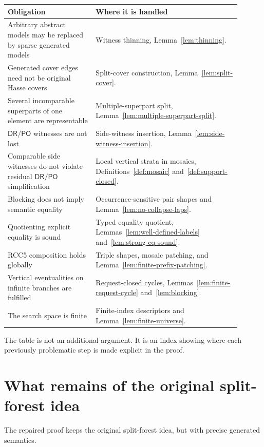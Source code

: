 \documentclass[11pt]{article}
\newcommand{\DR}{\mathsf{DR}}
\newcommand{\PO}{\mathsf{PO}}
\begin{document}
\begin{center}
\begin{tabular}{p{0.34\linewidth}p{0.56\linewidth}}
\toprule
Obligation & Where it is handled \\
\midrule
Arbitrary abstract models may be replaced by sparse generated models & Witness thinning, Lemma~\ref{lem:thinning}. \\
Generated cover edges need not be original Hasse covers & Split-cover construction, Lemma~\ref{lem:split-cover}. \\
Several incomparable superparts of one element are representable & Multiple-superpart split, Lemma~\ref{lem:multiple-superpart-split}. \\
$\DR/\PO$ witnesses are not lost & Side-witness insertion, Lemma~\ref{lem:side-witness-insertion}. \\
Comparable side witnesses do not violate residual $\DR/\PO$ simplification & Local vertical strata in mosaics, Definitions~\ref{def:mosaic} and~\ref{def:support-closed}. \\
Blocking does not imply semantic equality & Occurrence-sensitive pair shapes and Lemma~\ref{lem:no-collapse-laps}. \\
Quotienting explicit equality is sound & Typed equality quotient, Lemmas~\ref{lem:well-defined-labels} and~\ref{lem:strong-eq-sound}. \\
RCC5 composition holds globally & Triple shapes, mosaic patching, and Lemma~\ref{lem:finite-prefix-patching}. \\
Vertical eventualities on infinite branches are fulfilled & Request-closed cycles, Lemmas~\ref{lem:finite-request-cycle} and~\ref{lem:blocking}. \\
The search space is finite & Finite-index descriptors and Lemma~\ref{lem:finite-universe}. \\
\bottomrule
\end{tabular}
\end{center}

The table is not an additional argument.  It is an index showing where each previously problematic step is made explicit in the proof.


\section{What remains of the original split-forest idea}

The repaired proof keeps the original split-forest idea, but with precise generated semantics.
\end{document}
